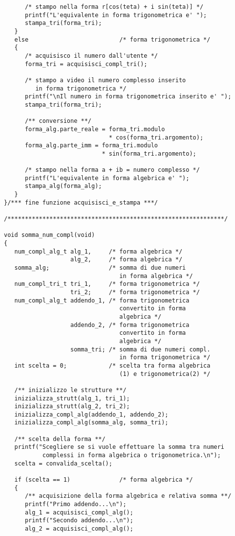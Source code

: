 \documentclass[a4paper,10pt]{article}
\begin{document}
\begin{verbatim}
      /* stampo nella forma r[cos(teta) + i sin(teta)] */
      printf("L'equivalente in forma trigonometrica e' ");
      stampa_tri(forma_tri);
   }
   else                          /* forma trigonometrica */
   {
      /* acquisisco il numero dall'utente */
      forma_tri = acquisisci_compl_tri();

      /* stampo a video il numero complesso inserito
         in forma trigonometrica */
      printf("\nIl numero in forma trigonometrica inserito e' ");
      stampa_tri(forma_tri);

      /** conversione **/
      forma_alg.parte_reale = forma_tri.modulo
                              * cos(forma_tri.argomento);
      forma_alg.parte_imm = forma_tri.modulo
                            * sin(forma_tri.argomento);

      /* stampo nella forma a + ib = numero complesso */
      printf("L'equivalente in forma algebrica e' ");
      stampa_alg(forma_alg);
   }
}/*** fine funzione acquisisci_e_stampa ***/

/**************************************************************/

void somma_num_compl(void)
{
   num_compl_alg_t alg_1,     /* forma algebrica */
                   alg_2,     /* forma algebrica */
   somma_alg;                 /* somma di due numeri
                                 in forma algebrica */
   num_compl_tri_t tri_1,     /* forma trigonometrica */
                   tri_2;     /* forma trigonometrica */
   num_compl_alg_t addendo_1, /* forma trigonometrica
                                 convertito in forma
                                 algebrica */
                   addendo_2, /* forma trigonometrica
                                 convertito in forma
                                 algebrica */
                   somma_tri; /* somma di due numeri compl.
                                 in forma trigonometrica */
   int scelta = 0;            /* scelta tra forma algebrica
                                 (1) e trigonometrica(2) */

   /** inizializzo le strutture **/
   inizializza_strutt(alg_1, tri_1);
   inizializza_strutt(alg_2, tri_2);
   inizializza_compl_alg(addendo_1, addendo_2);
   inizializza_compl_alg(somma_alg, somma_tri);

   /** scelta della forma **/
   printf("Scegliere se si vuole effettuare la somma tra numeri
           complessi in forma algebrica o trigonometrica.\n");
   scelta = convalida_scelta();

   if (scelta == 1)              /* forma algebrica */
   {
      /** acquisizione della forma algebrica e relativa somma **/
      printf("Primo addendo...\n");
      alg_1 = acquisisci_compl_alg();
      printf("Secondo addendo...\n");
      alg_2 = acquisisci_compl_alg();


\end{verbatim}
\end{document}
